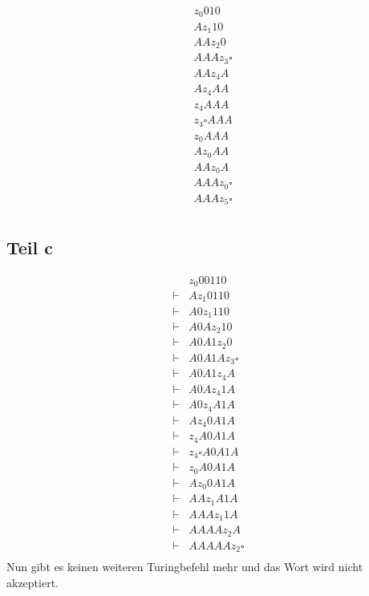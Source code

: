 \documentclass[10pt,a4paper]{article}
\begin{document}
\begin{align*}
  & z_{0} 010\\
  & A z_{1} 10\\
  & AA z_{2} 0\\
  & AAA z_{3} \square\\
  & AA z_{4} A\\
  & A z_{4} AA\\
  & z_{4} AAA\\
  & z_{4} \square AAA\\
  & z_{0} AAA\\
  & A z_{0} AA\\
  & AA z_{0} A\\
  & AAA z_{0} \square\\
  & AAA z_{5} \square\\
\end{align*}

\subsection{Teil c}

\begin{align*}
  & z_{0}00110\\
  \vdash & A z_{1} 0110\\
  \vdash & A0 z_{1} 110\\
  \vdash & A0A z_{2} 10\\
  \vdash & A0A1 z_{2} 0\\
  \vdash & A0A1A z_{3} \square\\
  \vdash & A0A1 z_{4} A\\
  \vdash & A0A z_{4} 1A\\
  \vdash & A0 z_{4} A1A\\
  \vdash & A z_{4} 0A1A\\
  \vdash & z_{4} A0A1A\\
  \vdash & z_{4} \square A0A1A\\
  \vdash & z_{0} A0A1A\\
  \vdash & A z_{0} 0A1A\\
  \vdash & AA z_{1} A1A\\
  \vdash & AAA z_{1} 1A\\
  \vdash & AAAA z_{2} A\\
  \vdash & AAAAA z_{2} \square\\
\end{align*}
Nun gibt es keinen weiteren Turingbefehl mehr und das Wort wird nicht akzeptiert.
\end{document}
